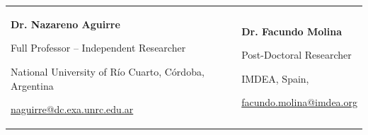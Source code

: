 

\begin{tabularx}{\textwidth}{@{}X X@{}}
\textbf{Dr. Nazareno Aguirre}\par
Full Professor -- Independent Researcher\par
National University of Río Cuarto, Córdoba, Argentina\par 
\href{mailto:naguirre@dc.exa.unrc.edu.ar}{naguirre@dc.exa.unrc.edu.ar}
& 
\textbf{Dr. Facundo Molina}\par
Post-Doctoral Researcher\par
IMDEA, Spain,\par
\href{mailto:facundo.molina@imdea.org}{facundo.molina@imdea.org}
\\
\end{tabularx}